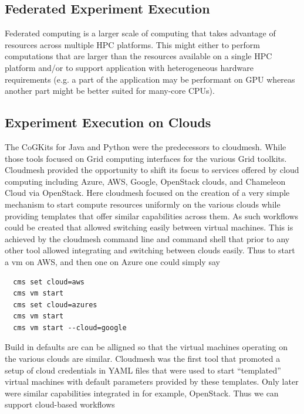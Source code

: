 \documentclass[utf8]{FrontiersinVancouver} %
\begin{document}
\subsection{Federated Experiment Execution}

Federated computing is a larger scale of computing that takes advantage of resources across multiple HPC platforms. This might either to perform computations that are larger than the resources available on a single HPC platform and/or to support application with heterogeneous hardware requirements (e.g. a part of the application may be performant on GPU whereas another part might be better suited for many-core CPUs). 

\subsection{Experiment Execution on Clouds}

The CoGKits for Java and Python were the predecessors to cloudmesh. While those tools focused on Grid computing interfaces for the various Grid toolkits. Cloudmesh provided the opportunity to shift its focus to services offered by cloud computing including Azure, AWS, Google, OpenStack clouds, and Chameleon Cloud via OpenStack. Here cloudmesh focused on the creation of a very simple mechanism to start compute resources uniformly on the various clouds while providing templates that offer similar capabilities across them. As such workflows could be created that allowed switching easily between virtual machines. This is achieved by the cloudmesh command line and command shell that prior to any other tool allowed integrating and switching between clouds easily. Thus to start a vm on AWS, and then one on Azure one could simply say

\begin{verbatim}
  cms set cloud=aws
  cms vm start
  cms set cloud=azures
  cms vm start
  cms vm start --cloud=google
\end{verbatim}

Build in defaults are can be alligned so that the virtual machines operating on the various clouds are similar.
Cloudmesh was the first tool that promoted a setup of cloud credentials in YAML files that were used to start ``templated'' virtual machines with default parameters provided by these templates. Only later were similar capabilities integrated in for example,  OpenStack. Thus we can support cloud-based workflows
\end{document}
